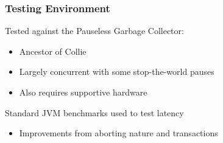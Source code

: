 \documentclass{beamer}
\newcommand{\linespace}{\vskip 0.25cm}
\begin{document}
\begin{frame}

\frametitle{Testing Environment}

Tested against the Pauseless Garbage Collector:
\begin{itemize}
\item Ancestor of Collie
\item Largely concurrent with some stop-the-world pauses
\item Also requires supportive hardware
\end{itemize}

\linespace
\linespace

Standard JVM benchmarks used to test latency
\begin{itemize}
\item Improvements from aborting nature and transactions
\end{itemize}

\end{frame}
\end{document}
